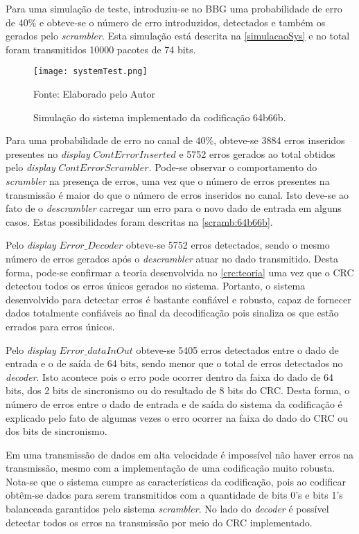 Para uma simulação de teste, introduziu-se no BBG uma probabilidade de erro de 40\% e obteve-se o número de erro introduzidos, detectados e também os gerados pelo \textit{scrambler}. Esta simulação está descrita na \autoref{simulacaoSys} e no total foram transmitidos 10000 pacotes de 74 bits.

\begin{figure}[H]
	\caption{\label{simulacaoSys} Simulação do sistema implementado da codificação 64b66b.}
	\centering
	\texttt{[image: systemTest.png]}
	\begin{center}
		Fonte: Elaborado pelo Autor
	\end{center}	
\end{figure}

Para uma probabilidade de erro no canal de 40\%, obteve-se 3884 erros inseridos presentes no \textit{display} $ContErrorInserted$ e 5752 erros gerados ao total obtidos pelo \textit{display} $ContErrorScrambler$. Pode-se observar o comportamento do \textit{scrambler} na presença de erros, uma vez que o número de erros presentes na transmissão é maior do que o número de erros inseridos no canal. Isto deve-se ao fato de o \textit{descrambler} carregar um erro para o novo dado de entrada em alguns casos. Estas possibilidades foram descritas na \autoref{scramb:64b66b}. 

Pelo \textit{display} $Error\_Decoder$ obteve-se 5752 erros detectados, sendo o mesmo número de erros gerados após o \textit{descrambler} atuar no dado transmitido. Desta forma, pode-se confirmar a teoria desenvolvida no \autoref{crc:teoria} uma vez que o CRC detectou todos os erros únicos gerados no sistema. Portanto, o sistema desenvolvido para detectar erros é bastante confiável e robusto, capaz de fornecer dados totalmente confiáveis ao final da decodificação pois sinaliza os que estão errados para erros únicos.

Pelo \textit{display} $Error\_dataInOut$ obteve-se 5405 erros detectados entre o dado de entrada e o de saída de 64 bits, sendo menor que o total de erros detectados no \textit{decoder}. Isto acontece pois o erro pode ocorrer dentro da faixa do dado de 64 bits, dos 2 bits de sincronismo ou do resultado de 8 bits do CRC. Desta forma, o número de erros entre o dado de entrada e de saída do sistema da codificação é explicado pelo fato de algumas vezes o erro ocorrer na faixa do dado do CRC ou dos bits de sincronismo.

Em uma transmissão de dados em alta velocidade é impossível não haver erros na transmissão, mesmo com a implementação de uma codificação muito robusta. Nota-se que o sistema cumpre as características da codificação, pois ao codificar obtêm-se dados para serem transmitidos com a quantidade de bits 0’s e bits 1’s balanceada garantidos pelo sistema \textit{scrambler}. No lado do \textit{decoder} é possível detectar todos os erros na transmissão por meio do CRC implementado.  

